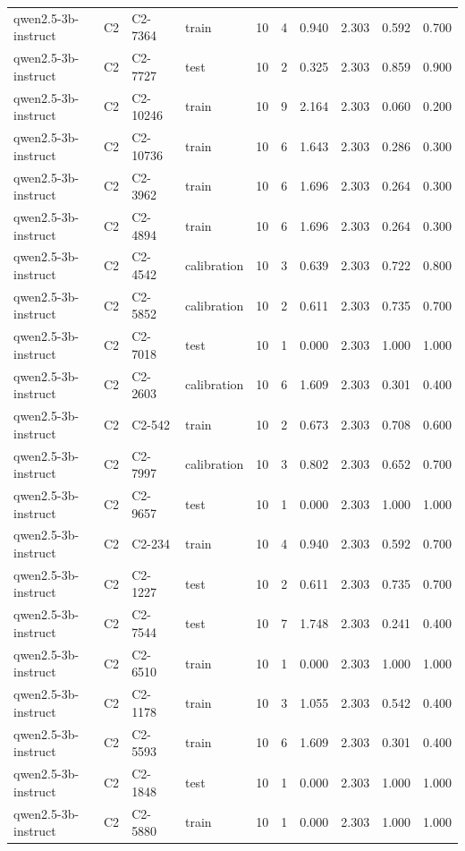 \begin{table}
\begin{tabular}{llllrrrrrr}
qwen2.5-3b-instruct & C2 & C2-7364 & train & 10 & 4 & 0.940 & 2.303 & 0.592 & 0.700 \\
qwen2.5-3b-instruct & C2 & C2-7727 & test & 10 & 2 & 0.325 & 2.303 & 0.859 & 0.900 \\
qwen2.5-3b-instruct & C2 & C2-10246 & train & 10 & 9 & 2.164 & 2.303 & 0.060 & 0.200 \\
qwen2.5-3b-instruct & C2 & C2-10736 & train & 10 & 6 & 1.643 & 2.303 & 0.286 & 0.300 \\
qwen2.5-3b-instruct & C2 & C2-3962 & train & 10 & 6 & 1.696 & 2.303 & 0.264 & 0.300 \\
qwen2.5-3b-instruct & C2 & C2-4894 & train & 10 & 6 & 1.696 & 2.303 & 0.264 & 0.300 \\
qwen2.5-3b-instruct & C2 & C2-4542 & calibration & 10 & 3 & 0.639 & 2.303 & 0.722 & 0.800 \\
qwen2.5-3b-instruct & C2 & C2-5852 & calibration & 10 & 2 & 0.611 & 2.303 & 0.735 & 0.700 \\
qwen2.5-3b-instruct & C2 & C2-7018 & test & 10 & 1 & 0.000 & 2.303 & 1.000 & 1.000 \\
qwen2.5-3b-instruct & C2 & C2-2603 & calibration & 10 & 6 & 1.609 & 2.303 & 0.301 & 0.400 \\
qwen2.5-3b-instruct & C2 & C2-542 & train & 10 & 2 & 0.673 & 2.303 & 0.708 & 0.600 \\
qwen2.5-3b-instruct & C2 & C2-7997 & calibration & 10 & 3 & 0.802 & 2.303 & 0.652 & 0.700 \\
qwen2.5-3b-instruct & C2 & C2-9657 & test & 10 & 1 & 0.000 & 2.303 & 1.000 & 1.000 \\
qwen2.5-3b-instruct & C2 & C2-234 & train & 10 & 4 & 0.940 & 2.303 & 0.592 & 0.700 \\
qwen2.5-3b-instruct & C2 & C2-1227 & test & 10 & 2 & 0.611 & 2.303 & 0.735 & 0.700 \\
qwen2.5-3b-instruct & C2 & C2-7544 & test & 10 & 7 & 1.748 & 2.303 & 0.241 & 0.400 \\
qwen2.5-3b-instruct & C2 & C2-6510 & train & 10 & 1 & 0.000 & 2.303 & 1.000 & 1.000 \\
qwen2.5-3b-instruct & C2 & C2-1178 & train & 10 & 3 & 1.055 & 2.303 & 0.542 & 0.400 \\
qwen2.5-3b-instruct & C2 & C2-5593 & train & 10 & 6 & 1.609 & 2.303 & 0.301 & 0.400 \\
qwen2.5-3b-instruct & C2 & C2-1848 & test & 10 & 1 & 0.000 & 2.303 & 1.000 & 1.000 \\
qwen2.5-3b-instruct & C2 & C2-5880 & train & 10 & 1 & 0.000 & 2.303 & 1.000 & 1.000 \\

\end{tabular}
\end{table}
